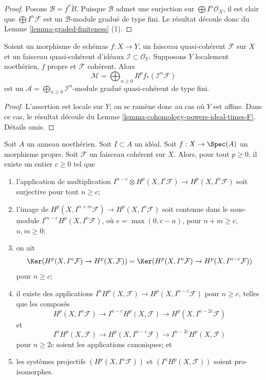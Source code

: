 \begin{proof}
Posons $\mathcal{B} = f^*\widetilde{B}$. Puisque $\mathcal{B}$ admet une surjection
sur $\bigoplus I^n\mathcal{O}_X$, il est clair que
$\bigoplus I^n\mathcal{F}$ est un $\mathcal{B}$-module gradué de type fini.
Le résultat découle donc du Lemme \ref{lemma-graded-finiteness} (1).
\end{proof}

\begin{lemma}
\label{lemma-cohomology-powers-ideal-times-sheaf}
Soient un morphisme de schémas $f : X \to Y$, un faisceau quasi-cohérent
$\mathcal{F}$ sur $X$ et un faisceau quasi-cohérent d'idéaux
$\mathcal{I} \subset \mathcal{O}_Y$. Supposons $Y$ localement
noethérien, $f$ propre et $\mathcal{F}$ cohérent.
Alors
$$
\mathcal{M} =
\bigoplus\nolimits_{n \geq 0} R^pf_*(\mathcal{I}^n\mathcal{F})
$$
est un $\mathcal{A} = \bigoplus_{n \geq 0} \mathcal{I}^n$-module gradué
quasi-cohérent de type fini.
\end{lemma}

\begin{proof}
L'assertion est locale sur $Y$; on se ramène donc au
cas où $Y$ est affine. Dans ce cas, le résultat découle
du Lemme \ref{lemma-cohomology-powers-ideal-times-F}.
Détails omis.
\end{proof}

\begin{lemma}
\label{lemma-cohomology-powers-ideal-application}
Soit $A$ un anneau noethérien.
Soit $I \subset A$ un idéal.
Soit $f : X \to \Spec(A)$ un morphisme propre.
Soit $\mathcal{F}$ un faisceau cohérent sur $X$.
Alors, pour tout $p \geq 0$, il existe un entier $c \geq 0$
tel que
\begin{enumerate}
\item l'application de multiplication
$I^{n - c} \otimes H^p(X, I^c\mathcal{F}) \to H^p(X, I^n\mathcal{F})$
soit surjective pour tout $n \geq c$;
\item l'image de $H^p(X, I^{n + m}\mathcal{F}) \to H^p(X, I^n\mathcal{F})$
soit contenue dans le sous-module $I^{m - e} H^p(X, I^n\mathcal{F})$,
où $e = \max(0, c - n)$, pour $n + m \geq c$, $n, m \geq 0$;
\item on ait
$$
\Ker(H^p(X, I^n\mathcal{F}) \to H^p(X, \mathcal{F})) =
\Ker(H^p(X, I^n\mathcal{F}) \to H^p(X, I^{n - c}\mathcal{F}))
$$
pour $n \geq c$;
\item il existe des applications $I^nH^p(X, \mathcal{F}) \to H^p(X, I^{n - c}\mathcal{F})$
pour $n \geq c$, telles que les composés
$$
H^p(X, I^n\mathcal{F}) \to 
I^{n - c}H^p(X, \mathcal{F}) \to
H^p(X, I^{n - 2c}\mathcal{F})
$$
et
$$
I^nH^p(X, \mathcal{F}) \to
H^p(X, I^{n - c}\mathcal{F}) \to
I^{n - 2c}H^p(X, \mathcal{F})
$$
pour $n \geq 2c$ soient les applications canoniques; et
\item les systèmes projectifs $(H^p(X, I^n\mathcal{F}))$ et
$(I^nH^p(X, \mathcal{F}))$ soient pro-isomorphes.
\end{enumerate}
\end{lemma}

